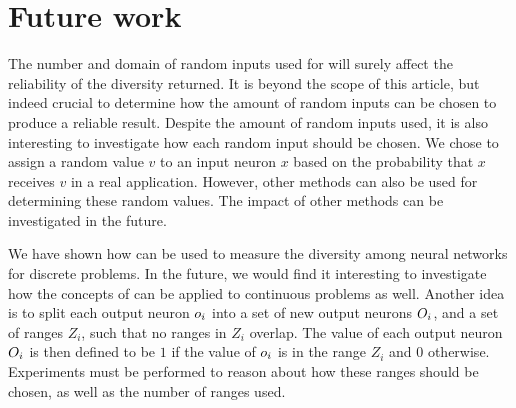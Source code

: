\section{Future work}\label{sec:futurework}
The number and domain of random inputs used for \dia{} will surely affect the reliability of the diversity returned.
It is beyond the scope of this article, but indeed crucial to determine how the amount of random inputs can be chosen to produce a reliable result.
Despite the amount of random inputs used, it is also interesting to investigate how each random input should be chosen.
We chose to assign a random value $v$ to an input neuron $x$ based on the probability that $x$ receives $v$ in a real application.
However, other methods can also be used for determining these random values.
The impact of other methods can be investigated in the future. 

We have shown how \dia{} can be used to measure the diversity among neural networks for discrete problems. In the future, we would find it interesting to investigate how the concepts of \dia{} can be applied to continuous problems as well. Another idea is to split each output neuron $o_i$ into a set of new output neurons $O_i$, and a set of ranges $Z_i$, such that no ranges in $Z_i$ overlap. The value of each output neuron $O_i$ is then defined to be $1$ if the value of $o_i$ is in the range $Z_i$ and 0 otherwise. Experiments must be performed to reason about how these ranges should be chosen, as well as the number of ranges used.
